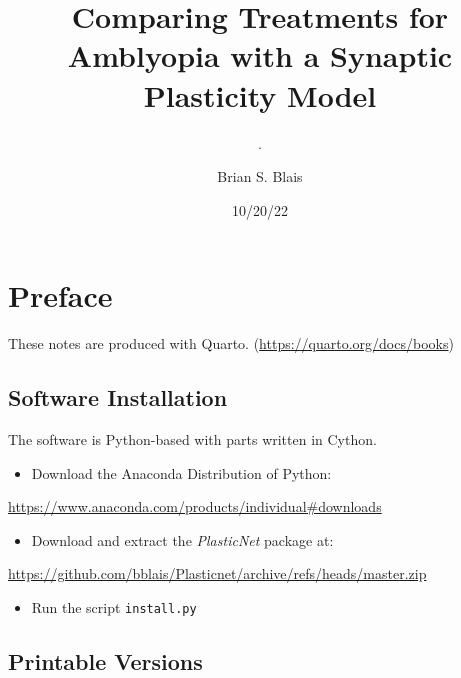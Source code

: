 \documentclass[
  letterpaper,
]{book}
\title{Comparing Treatments for Amblyopia with a Synaptic Plasticity
Model}
\subtitle{.}
\author{Brian S. Blais}
\date{10/20/22}
\providecommand{\tightlist}{%
  \setlength{\itemsep}{0pt}\setlength{\parskip}{0pt}}\usepackage{longtable,booktabs,array}
\renewcommand*\contentsname{Table of contents}
\newcommand\contentsname{Table of contents}
\begin{document}
\frontmatter
\maketitle
\ifdefined\Shaded\renewenvironment{Shaded}{\begin{tcolorbox}[frame hidden, borderline west={3pt}{0pt}{shadecolor}, boxrule=0pt, sharp corners, enhanced, interior hidden, breakable]}{\end{tcolorbox}}\fi

\renewcommand*\contentsname{Table of contents}
{
\setcounter{tocdepth}{2}
\tableofcontents
}
\mainmatter
{}

\hypertarget{preface}{%
\chapter*{Preface}\label{preface}}

These notes are produced with Quarto.
(\url{https://quarto.org/docs/books})

\hypertarget{software-installation}{%
\section*{Software Installation}\label{software-installation}}

The software is Python-based with parts written in Cython.

\begin{itemize}
\tightlist
\item
  Download the Anaconda Distribution of Python:
\end{itemize}

\url{https://www.anaconda.com/products/individual\#downloads}

\begin{itemize}
\tightlist
\item
  Download and extract the \emph{PlasticNet} package at:
\end{itemize}

\url{https://github.com/bblais/Plasticnet/archive/refs/heads/master.zip}

\begin{itemize}
\tightlist
\item
  Run the script \texttt{install.py}
\end{itemize}

\hypertarget{printable-versions}{%
\section*{Printable Versions}\label{printable-versions}}
\end{document}
